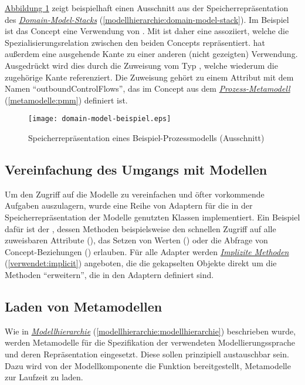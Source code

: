 \documentclass[a4paper,10pt]{sphinxmanual}
\begin{document}
\hyperref[modellanbindung:domain-model-beispiel]{Abbildung  \ref*{modellanbindung:domain-model-beispiel}} zeigt beispielhaft einen Ausschnitt aus der Speicherrepräsentation des {\hyperref[modellhierarchie:domain-model-stack]{\emph{Domain-Model-Stacks}}} (\autoref*{modellhierarchie:domain-model-stack}).
Im Beispiel ist das Concept  eine Verwendung von .
Mit  ist daher eine  assoziiert, welche die Spezialisierungsrelation zwischen den beiden Concepts repräsentiert.
 hat außerdem eine ausgehende Kante zu einer anderen (nicht gezeigten) Verwendung.
Ausgedrückt wird dies durch die Zuweisung vom Typ , welche wiederum die zugehörige Kante  referenziert.
Die Zuweisung gehört zu einem Attribut mit dem Namen "`outboundControlFlows"', das im Concept  aus dem {\hyperref[metamodelle:pmm]{\emph{Prozess-Metamodell}}} (\autoref*{metamodelle:pmm}) definiert ist.
\begin{figure}[htbp]
\centering
\capstart

\texttt{[image: domain-model-beispiel.eps]}
\caption{Speicherrepräsentation eines Beispiel-Prozessmodells (Ausschnitt)}\label{modellanbindung:domain-model-beispiel}\end{figure}


\subsection{Vereinfachung des Umgangs mit Modellen}
\label{modellanbindung:vereinfachung-des-umgangs-mit-modellen}
Um den Zugriff auf die Modelle zu vereinfachen und öfter vorkommende Aufgaben auszulagern, wurde eine Reihe von Adaptern für die in der Speicherrepräsentation der Modelle genutzten Klassen implementiert.
Ein Beispiel dafür ist der , dessen Methoden beispielsweise den schnellen Zugriff auf alle zuweisbaren Attribute (), das Setzen von Werten () oder die Abfrage von Concept-Beziehungen () erlauben.
Für alle Adapter werden {\hyperref[verwendet:implicit]{\emph{Implizite Methoden}}} (\autoref*{verwendet:implicit}) angeboten, die die gekapselten Objekte direkt um die Methoden "`erweitern"', die in den Adaptern definiert sind.


\subsection{Laden von Metamodellen}
\label{modellanbindung:laden-metamodelle}\label{modellanbindung:laden-von-metamodellen}
Wie in {\hyperref[modellhierarchie:modellhierarchie]{\emph{Modellhierarchie}}} (\autoref*{modellhierarchie:modellhierarchie}) beschrieben wurde, werden Metamodelle für die Spezifikation der verwendeten Modellierungssprache und deren Repräsentation eingesetzt.
Diese sollen prinzipiell austauschbar sein. Dazu wird von der Modellkomponente die Funktion bereitgestellt, Metamodelle zur Laufzeit zu laden.
\end{document}

